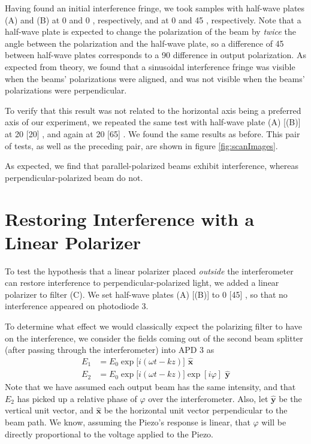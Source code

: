 \documentclass[letter]{article}
\newcommand{\BVEC}[1]{\hat{\boldsymbol{#1}}}
\begin{document}
Having found an initial interference fringe, we took samples with half-wave plates (A) and (B) at 0 and 0 \unit{\deg}, respectively, and at 0 and 45 \unit{\deg}, respectively. Note that a half-wave plate is expected to change the polarization of the beam by \textit{twice} the angle between the polarization and the half-wave plate, so a difference of \qty{45}{\deg} between half-wave plates corresponds to a \qty{90}{\deg} difference in output polarization. As expected from theory, we found that a sinusoidal interference fringe was visible when the beams' polarizations were aligned, and was not visible when the beams' polarizations were perpendicular.

To verify that this result was not related to the horizontal axis being a preferred axis of our experiment, we repeated the same test with half-wave plate (A) [(B)] at 20 [20] \unit{\deg}, and again at 20 [65] \unit{\deg}. We found the same results as before. This pair of tests, as well as the preceding pair, are shown in figure \ref{fig:scanImages}.

As expected, we find that parallel-polarized beams exhibit interference, whereas perpendicular-polarized beam do not.

\section{Restoring Interference with a Linear Polarizer}

To test the hypothesis that a linear polarizer placed \textit{outside} the interferometer can restore interference to perpendicular-polarized light, we added a linear polarizer to filter (C). We set half-wave plates (A) [(B)] to 0 [45] \unit{\deg}, so that no interference appeared on photodiode 3.

To determine what effect we would classically expect the polarizing filter to have on the interference, we consider the fields coming out of the second beam splitter (after passing through the interferometer) into APD 3 as
\begin{align}
E_1 &= E_0 \exp \big[ i (\omega t - kz) \big] \,\, \BVEC{x} \\
E_2 &= E_0 \exp \big[ i (\omega t - kz) \big] \exp[i\varphi] \,\, \BVEC{y}
\end{align}
Note that we have assumed each output beam has the same intensity, and that $E_2$ has picked up a relative phase of $\varphi$ over the interferometer. Also, let $\BVEC{y}$ be the vertical unit vector, and $\BVEC{x}$ be the horizontal unit vector perpendicular to the beam path. We know, assuming the Piezo's response is linear, that $\varphi$ will be directly proportional to the voltage applied to the Piezo.
\end{document}

